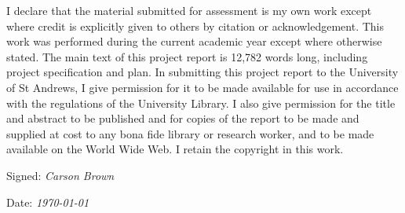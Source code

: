 \documentclass[
11pt, %
oneside, %
english, %
singlespacing, %
liststotoc, %
toctotoc, %
parskip, %
headsepline, %
]{MastersDoctoralThesis} %
\begin{document}
\begin{declaration}
I declare that the material submitted for assessment is my own work except where credit is explicitly given to others by citation or acknowledgement. This work was performed during the current academic year except where otherwise stated. The main text of this project report is 12,782 words long, including project specification and plan. In submitting this project report to the University of St Andrews, I give permission for it to be made available for use in accordance with the regulations of the University Library. I also give permission for the title and abstract to be published and for copies of the report to be made and supplied at cost to any bona fide library or research worker, and to be made available on the World Wide Web. I retain the copyright in this work.

\noindent Signed: \textit{Carson Brown}

\noindent Date: \textit{\today}
\end{declaration}


%
%

%

%


\tableofcontents %

\listoffigures %


\end{document}
